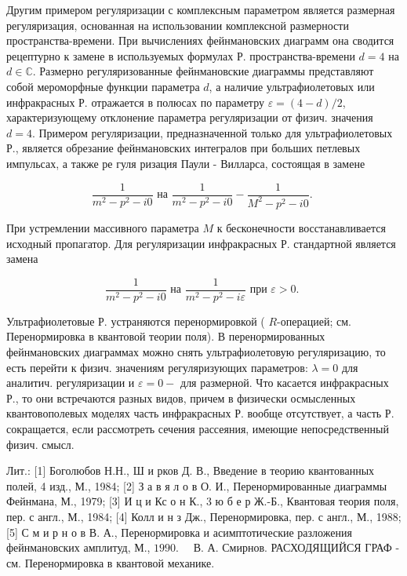 \documentclass[10pt]{article}
\begin{document}
Другим примером регуляризации с комплексным параметром является размерная регуляризация, основанная на использовании комплексной размерности пространства-времени. При вычислениях фейнмановских диаграмм она сводится рецептурно к замене в используемых формулах Р. пространства-времени $d=4$ на $d \in \mathbb{C}$. Размерно регуляризованные фейнмановские диаграммы представляют собой мероморфные функции параметра $d$, а наличие ультрафиолетовых или инфракрасных Р. отражается в полюсах по параметру $\varepsilon=(4-d) / 2$, характеризующему отклонение параметра регуляризации от физич. значения $d=4$. Примером регуляризации, предназначенной только для ультрафиолетовых Р., является обрезание фейнмановских интегралов при больших петлевых импульсах, а также ре гуля ризация Паули - Вилларса, состоящая в замене



\[

\frac{1}{m^{2}-p^{2}-i 0} \text { на } \frac{1}{m^{2}-p^{2}-i 0}-\frac{1}{M^{2}-p^{2}-i 0} \text {. }

\]



При устремлении массивного параметра $M$ к бесконечности восстанавливается исходный пропагатор. Для регуляризации инфракрасных Р. стандартной является замена



\[

\frac{1}{m^{2}-p^{2}-i 0} \text { на } \frac{1}{m^{2}-p^{2}-i \varepsilon} \text { при } \varepsilon>0 \text {. }

\]



Ультрафиолетовые Р. устраняются перенормировкой ( $R$-операцией; см. Перенормировка в квантовой теории поля). В перенормированных фейнмановских диаграммах можно снять ультрафиолетовую регуляризацию, то есть перейти к физич. значениям регуляризующих параметров: $\lambda=0$ для аналитич. регуляризации и $\varepsilon=0-$ для размерной. Что касается инфракрасных Р., то они встречаются разных видов, причем в физически осмысленных квантовополевых моделях часть инфракрасных Р. вообще отсутствует, а часть Р. сокращается, если рассмотреть сечения рассеяния, имеющие непосредственный физич. смысл.



Лит.: [1] Боголюбов Н.Н., Ш и рков Д. В., Введение в теорию квантованных полей, 4 изд., М., 1984; [2] З а в я л о в О. И., Перенормированные диаграммы Фейнмана, М., 1979; [3] И ц и Кс о н К., 3 ю б е р Ж.-Б., Квантовая теория поля, пер. с англ., М., 1984; [4] Колл и н з Дж., Перенормировка, пер. с англ., М., 1988; [5] С м и р н о в В. А., Перенормировка и асимптотические разложения фейнмановских амплитуд, М., $1990 . \quad$ В. А. Смирнов. РАСХОДЯЩИЙСЯ ГРАФ - см. Перенормировка в квантовой механике.
\end{document}
